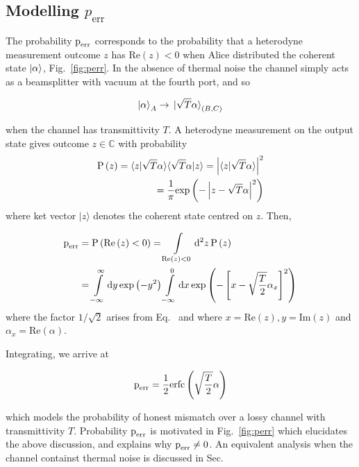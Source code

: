 \subsection{Modelling $p_{\text{err}}$}\label{sec:qds_modelling_perr}

The probability $\text{p}_{\text{err}}$ corresponds to the probability that a heterodyne measurement outcome $z$ has $\text{Re}\left(z\right) < 0$ when Alice distributed the coherent state $\ket{\alpha}$, Fig.~\ref{fig:perr}. In the absence of thermal noise the channel simply acts as a beamsplitter with vacuum at the fourth port, and so

\begin{equation}
\ket{\alpha}_A \rightarrow \ket*{\sqrt{T}\alpha}_{\left(B, C\right)}
\end{equation}


\noindent when the channel has transmittivity $T$. A heterodyne measurement on the output state gives outcome $z \in \mathbb{C}$ with probability
\begin{align}
\text{P}\left(z\right) = \langle z | \sqrt{T}\alpha\rangle\langle\sqrt{T}\alpha|z\rangle = \left|\langle z | \sqrt{T} \alpha \rangle \right|^2& \notag \\
= \frac{1}{\pi}\text{exp}\left( - \left| z - \sqrt{T}\alpha \right|^2 \right)&
\end{align}
where ket vector $|z\rangle$ denotes the coherent state centred on $z$. Then,

\begin{align}
\text{p}_{\text{err}} &= \text{P}\left(\text{Re}\left(z\right)<0\right) = \int\limits_{\text{Re}\left(z\right)<0}\mathop{}\!\mathrm{d^2} z \, \text{P}\left(z\right) \notag \\
&= \int\limits_{-\infty}^{\infty} \mathrm{d} y \, \text{exp}\left(-y^2\right) \int\limits_{-\infty}^{0} \mathrm{d} x \, \text{exp}\left(-\left[x - \sqrt{\frac{T}{2}}\alpha_x\right]^2\right)
\end{align}
where the factor $1/\sqrt{2}$ arises from Eq.~ %
and where $x = \text{Re}\left(z\right), y = \text{Im}\left(z\right)$ and $\alpha_x = \text{Re}\left(\alpha\right)$. 

Integrating, we arrive at

\begin{equation}\label{eqn:perr}
\text{p}_{\text{err}} = \frac{1}{2}\text{erfc}\left(\sqrt{\frac{T}{2}}\alpha\right)
\end{equation}

\noindent which models the probability of honest mismatch over a lossy channel with transmittivity $T$. Probability $\text{p}_{\text{err}}$ is motivated in Fig.~\ref{fig:perr} which elucidates the above discussion, and explains why $\text{p}_{\text{err}} \ne 0$. An equivalent analysis when the channel containst thermal noise is discussed in Sec.~

